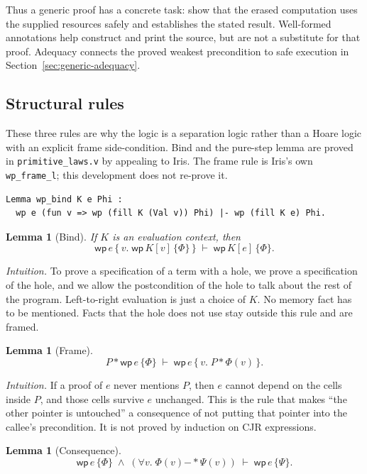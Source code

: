 \documentclass[11pt]{article}
\newtheorem{lemma}[theorem]{Lemma}
\newcommand{\cjr}{CJR}
\newcommand{\sep}{\mathbin{*}}
\newcommand{\wand}{\mathbin{-\!\!*}}
\newcommand{\Wpre}{\mathsf{wp}}
\begin{document}
Thus a generic proof has a concrete task: show that the erased computation
uses the supplied resources safely and establishes the stated result.
Well-formed annotations help construct and print the source, but are not
a substitute for that proof. Adequacy connects the proved weakest
precondition to safe execution in Section~\ref{sec:generic-adequacy}.

\subsection{Structural rules}

These three rules are why the logic is a separation logic rather than a Hoare logic with an explicit frame side-condition.
Bind and the pure-step lemma are proved in \texttt{primitive\_laws.v} by appealing to Iris.
The frame rule is Iris's own \texttt{wp\_frame\_l}; this development does not re-prove it.

\begin{lstlisting}
Lemma wp_bind K e Phi :
  wp e (fun v => wp (fill K (Val v)) Phi) |- wp (fill K e) Phi.
\end{lstlisting}

\begin{lemma}[Bind]
If \(K\) is an evaluation context, then
\[
\Wpre\,e\,\{\,v.\; \Wpre\,K[v]\,\{\Phi\}\,\}
\;\vdash\;
\Wpre\,K[e]\,\{\Phi\}.
\]
\end{lemma}

\noindent\textit{Intuition.}
To prove a specification of a term with a hole, we prove a specification of the hole, and we allow the postcondition of the hole to talk about the rest of the program.
Left-to-right evaluation is just a choice of \(K\).
No memory fact has to be mentioned.
Facts that the hole does not use stay outside this rule and are framed.

\begin{lemma}[Frame]
\[
P \sep \Wpre\,e\,\{\Phi\}
\;\vdash\;
\Wpre\,e\,\{\,v.\; P \sep \Phi(v)\,\}.
\]
\end{lemma}

\noindent\textit{Intuition.}
If a proof of \(e\) never mentions \(P\), then \(e\) cannot depend on the cells inside \(P\), and those cells survive \(e\) unchanged.
This is the rule that makes ``the other pointer is untouched'' a consequence of not putting that pointer into the callee's precondition.
It is not proved by induction on \cjr{} expressions.

\begin{lemma}[Consequence]
\[
\Wpre\,e\,\{\Phi\}
\;\wedge\;
(\forall v.\;\Phi(v)\wand \Psi(v))
\;\vdash\;
\Wpre\,e\,\{\Psi\}.
\]
\end{lemma}
\end{document}
